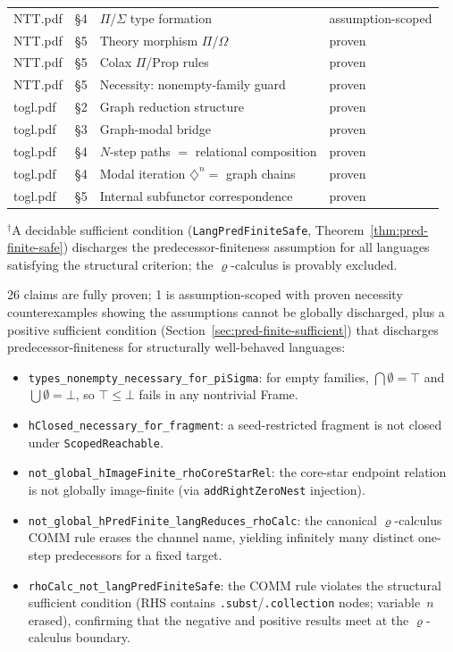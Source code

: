 \documentclass[]{article}
\newcommand{\code}[1]{\texttt{#1}}
\newcommand{\rhocalc}{\ensuremath{\varrho}}
\newcommand{\Dia}{\ensuremath{\diamondsuit}}
\begin{document}
\begin{longtable}{llll}
NTT.pdf & \S 4 & $\Pi$/$\Sigma$ type formation & assumption-scoped \\
NTT.pdf & \S 5 & Theory morphism $\Pi$/$\Omega$ & proven \\
NTT.pdf & \S 5 & Colax $\Pi$/Prop rules & proven \\
NTT.pdf & \S 5 & Necessity: nonempty-family guard & proven \\
\hline
togl.pdf & \S 2 & Graph reduction structure & proven \\
togl.pdf & \S 3 & Graph-modal bridge & proven \\
togl.pdf & \S 4 & $N$-step paths $=$ relational composition & proven \\
togl.pdf & \S 4 & Modal iteration $\Dia^n =$ graph chains & proven \\
togl.pdf & \S 5 & Internal subfunctor correspondence & proven \\
\end{longtable}

\noindent${}^\dagger$A decidable sufficient condition
(\code{LangPredFiniteSafe}, Theorem~\ref{thm:pred-finite-safe}) discharges
the predecessor-finiteness assumption for all languages satisfying the
structural criterion; the $\varrho$-calculus is provably excluded.

26 claims are fully proven; 1 is assumption-scoped with proven necessity
counterexamples showing the assumptions cannot be globally discharged, plus a
positive sufficient condition (Section~\ref{sec:pred-finite-sufficient}) that
discharges predecessor-finiteness for structurally well-behaved languages:
\begin{itemize}
\item \code{types\_nonempty\_necessary\_for\_piSigma}: for empty families,
  $\bigcap \emptyset = \top$ and $\bigcup \emptyset = \bot$, so
  $\top \le \bot$ fails in any nontrivial Frame.
\item \code{hClosed\_necessary\_for\_fragment}: a seed-restricted fragment
  is not closed under \code{ScopedReachable}.
\item \code{not\_global\_hImageFinite\_rhoCoreStarRel}: the core-star endpoint
  relation is not globally image-finite (via \code{addRightZeroNest} injection).
\item \code{not\_global\_hPredFinite\_langReduces\_rhoCalc}: the canonical
  $\varrho$-calculus COMM rule erases the channel name, yielding infinitely
  many distinct one-step predecessors for a fixed target.
\item \code{rhoCalc\_not\_langPredFiniteSafe}: the COMM rule violates the
  structural sufficient condition (RHS contains \code{.subst}/\code{.collection}
  nodes; variable~$n$ erased), confirming that the negative and positive results
  meet at the \rhocalc{}-calculus boundary.
\end{itemize}
\end{document}
